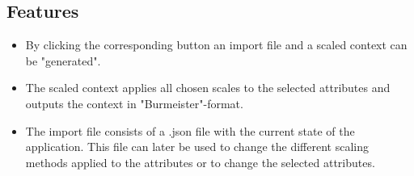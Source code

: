 \documentclass[]{article}
\begin{document}
\subsection{Features}
\begin{itemize}
    \item By clicking the corresponding button an import file and a scaled context can be "generated".
    \item The scaled context applies all chosen scales to the selected attributes and outputs the context in "Burmeister"-format.
    \item The import file consists of a .json file with the current state of the application. This file can later be used to change the different scaling methods applied to the attributes or to change the selected attributes.
\end{itemize}
\end{document}
